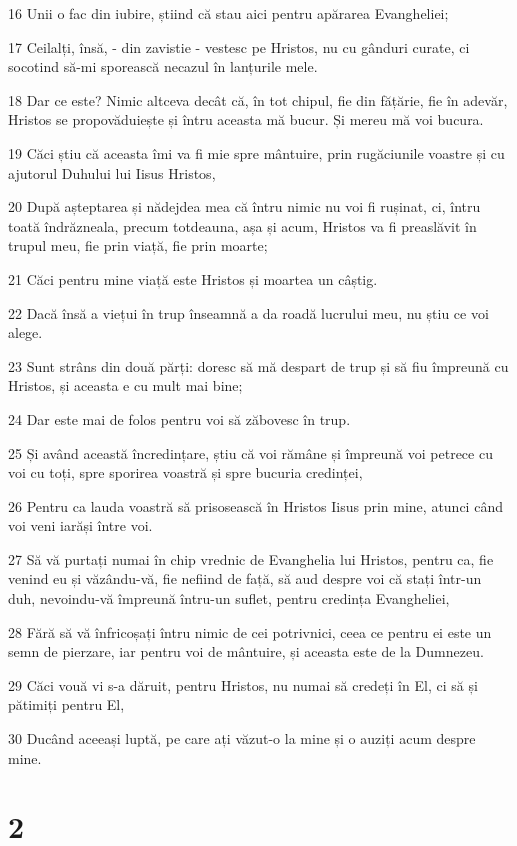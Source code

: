 \par 16 Unii o fac din iubire, știind că stau aici pentru apărarea Evangheliei;
\par 17 Ceilalți, însă, - din zavistie - vestesc pe Hristos, nu cu gânduri curate, ci socotind să-mi sporească necazul în lanțurile mele.
\par 18 Dar ce este? Nimic altceva decât că, în tot chipul, fie din fățărie, fie în adevăr, Hristos se propovăduiește și întru aceasta mă bucur. Și mereu mă voi bucura.
\par 19 Căci știu că aceasta îmi va fi mie spre mântuire, prin rugăciunile voastre și cu ajutorul Duhului lui Iisus Hristos,
\par 20 După așteptarea și nădejdea mea că întru nimic nu voi fi rușinat, ci, întru toată îndrăzneala, precum totdeauna, așa și acum, Hristos va fi preaslăvit în trupul meu, fie prin viață, fie prin moarte;
\par 21 Căci pentru mine viață este Hristos și moartea un câștig.
\par 22 Dacă însă a viețui în trup înseamnă a da roadă lucrului meu, nu știu ce voi alege.
\par 23 Sunt strâns din două părți: doresc să mă despart de trup și să fiu împreună cu Hristos, și aceasta e cu mult mai bine;
\par 24 Dar este mai de folos pentru voi să zăbovesc în trup.
\par 25 Și având această încredințare, știu că voi rămâne și împreună voi petrece cu voi cu toți, spre sporirea voastră și spre bucuria credinței,
\par 26 Pentru ca lauda voastră să prisosească în Hristos Iisus prin mine, atunci când voi veni iarăși între voi.
\par 27 Să vă purtați numai în chip vrednic de Evanghelia lui Hristos, pentru ca, fie venind eu și văzându-vă, fie nefiind de față, să aud despre voi că stați într-un duh, nevoindu-vă împreună întru-un suflet, pentru credința Evangheliei,
\par 28 Fără să vă înfricoșați întru nimic de cei potrivnici, ceea ce pentru ei este un semn de pierzare, iar pentru voi de mântuire, și aceasta este de la Dumnezeu.
\par 29 Căci vouă vi s-a dăruit, pentru Hristos, nu numai să credeți în El, ci să și pătimiți pentru El,
\par 30 Ducând aceeași luptă, pe care ați văzut-o la mine și o auziți acum despre mine.

\chapter{2}

